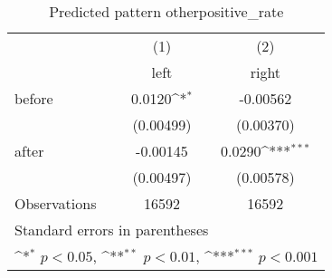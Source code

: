 \begin{table}[htbp]\centering
\def\sym#1{\ifmmode^{#1}\else\(^{#1}\)\fi}
\caption{Predicted pattern otherpositive\_rate}
\begin{tabular}{l*{2}{c}}
\hline\hline
                    &\multicolumn{1}{c}{(1)}&\multicolumn{1}{c}{(2)}\\
                    &\multicolumn{1}{c}{left}&\multicolumn{1}{c}{right}\\
\hline
before              &      0.0120\sym{*}  &    -0.00562         \\
                    &   (0.00499)         &   (0.00370)         \\
[1em]
after               &    -0.00145         &      0.0290\sym{***}\\
                    &   (0.00497)         &   (0.00578)         \\
\hline
Observations        &       16592         &       16592         \\
\hline\hline
\multicolumn{3}{l}{\footnotesize Standard errors in parentheses}\\
\multicolumn{3}{l}{\footnotesize \sym{*} \(p<0.05\), \sym{**} \(p<0.01\), \sym{***} \(p<0.001\)}\\
\end{tabular}
\end{table}
